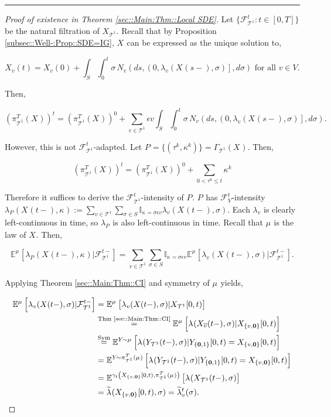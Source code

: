 \documentclass[12pt]{article}
\newcommand{\mb}{\mathbb}
\newcommand{\mc}{\mathcal}
\newcommand{\ov}{\overline}
\newcommand{\os}{\overset}
\newcommand{\te}{\text}
\newcommand{\ep}{\epsilon}
\newcommand{\lin}{\rule{\linewidth}{0.4 pt}}
\newcommand{\exmu}[2]{\mb{E}^{#1}\left[#2\right]}	%
\renewcommand{\root}{\mathbf{0}}				%
\renewcommand{\v}{v}							%
\renewcommand{\S}{S}							%
\newcommand{\s}{\sigma}							%
\newcommand{\ev}{\ep}							%
\newcommand{\T}{T}								%
\renewcommand{\t}{t}							%
\newcommand{\cl}{\ov}							%
\newcommand{\poiss}[1]{N_{#1}}						%
\newcommand{\pup}[1]{^{#1}}							%
\newcommand{\tree}{\mc{T}}							%
\newcommand{\V}{V}									%
\renewcommand{\tt}{s}								%
\newcommand{\rt}[1]{\tau^{#1}}						%
\renewcommand{\it}{k}								%
\newcommand{\piV}[2]{\pi_{#1}^{#2}}					%
\newcommand{\rxvt}[2]{X_{#1}{(#2)}}					%
\newcommand{\rxvtt}[2]{Y_{#1}{(#2)}}				%
\newcommand{\rxvts}[2]{X_{#1}{#2}}					%
\newcommand{\rxvtts}[2]{Y_{#1}{#2}}					%
\newcommand{\rp}[1]{P^{#1}}							%
\newcommand{\m}[3]{\mu_{#2#1}^{#3}}						%
\newcommand{\cm}{\gamma}							%
\newcommand{\rate}[1]{\lambda_{#1}}					%
\newcommand{\crate}[2]{\alt{\lambda}_{#1}^{#2}}		%
\newcommand{\F}[2]{\mc{F}_{#1}^{#2}}				%
\newcommand{\alt}{\widetilde}						%
\renewcommand{\mark}[1]{\kappa^{#1}}				%
\newcommand{\pmap}[1]{\Gamma_{#1}}				%
\begin{document}
\lin

\begin{proof}[Proof of existence in Theorem \ref{sec::Main:Thm::Local SDE}]

Let \(\{\F{\tree\pup{1}}{\t}:\t\in [0,\T]\}\) be the natural filtration of \(\rxvts{\tree\pup{1}}{}\). Recall that by Proposition \ref{subsec::Well-:Prop::SDE=IG}, \(\rxvts{}{}\) can be expressed as the unique solution to,

\[\rxvt{\v}{\t} = \rxvt{\v}{0} + \int_\S\int_0^\t \s\,\poiss{\v}\left(d\tt,\left(0,\rate{\v}(\rxvt{}{\tt-},\s)\right],d\s\right) \te{ for all } \v \in \V.\]

Then,

\[\left(\piV{\tree\pup{1}}{\T}(\rxvts{}{})\right)^\t = \left(\piV{\tree\pup{1}}{\T}(\rxvts{}{})\right)^0 + \sum_{\v \in \tree\pup{1}}\ev{\v}\int_\S\int_0^\t \s\,\poiss{\v}\left(d\tt,\left(0,\rate{\v}(\rxvt{}{\tt-},\s)\right],d\s\right).\]

However, this is not \(\F{\tree\pup{1}}{\t}\)-adapted. Let \(\rp{} = \{(\rt{\it},\mark{\it})\} = \pmap{\tree\pup{1}}(\rxvts{}{}).\) Then,

\[\left(\piV{\tree\pup{1}}{\T}(\rxvts{}{})\right)^\t = \left(\piV{\tree\pup{1}}{\T}(\rxvts{}{})\right)^0 + \sum_{0 < \rt{\it} \leq t}\mark{\it}\]

Therefore it suffices to derive the \(\F{\tree\pup{1}}{\t}\)-intensity of \(\rp{}\). \(\rp{}\) has \(\F{\V}{\t}\)-intensity \(\rate{\rp{}}(\rxvt{}{\t-},\mark{}) := \sum_{\v \in \tree^1}\sum_{\s\in S}\mb{I}_{\mark{} = \s\ev{\v}}\rate{\v}(\rxvt{}{\t-},\s)\). Each \(\rate{\v}\) is clearly left-continuous in time, so \(\rate{\rp{}}\) is also left-continuous in time. Recall that \(\m{}{}{}\) is the law of \(\rxvts{}{}\). Then,

\[\exmu{\m{}{}{}}{\rate{\rp{}}(\rxvt{}{\t-},\mark{})|\F{\tree\pup{1}}{\t-}} = \sum_{\v \in \tree\pup{1}}\sum_{\s\in S} \mb{I}_{\mark{} = \s\ev{\v}}\exmu{\m{}{}{}}{\rate{\v}(\rxvt{}{\t-},\s)|\F{\tree\pup{1}}{\t-}}.\]

Applying Theorem \ref{sec::Main:Thm::CI} and symmetry of \(\m{}{}{}\) yields,

\begin{align*}
\exmu{\m{}{}{}}{\rate{\v}(\rxvt{}{\t-},\s)|\F{\tree\pup{1}}{\t-}} &= \exmu{\m{}{}{}}{\rate{\v}(\rxvt{}{\t-},\s)|\rxvts{\tree\pup{1}}{[0,\t)}}\\
&\os{\te{Thm \ref{sec::Main:Thm::CI}}}{=} \exmu{\m{}{}{}}{\rate{}(\rxvt{\cl{\v}}{\t-},\s)|\rxvts{\{\v,\root\}}{[0,\t)}} \\
&\os{\te{Sym}}{=} \exmu{\rxvtts{}{}\sim \m{}{}{}}{\rate{}(\rxvtt{\tree\pup{1}}{\t-},\s)|\rxvtts{\{\root,1\}}{[0,\t)} = \rxvts{\{\v,\root\}}{[0,\t)}}\\
&= \exmu{\rxvtts{}{}\sim \piV{\tree\pup{1}}{\T}(\m{}{}{})}{\rate{}(\rxvtt{\tree\pup{1}}{\t-},\s)|\rxvtts{\{\root,1\}}{[0,\t)} = \rxvts{\{\v,\root\}}{[0,\t)}}\\
&= \exmu{\cm_\t\left(\rxvts{\{\v,\root\}}{[0,\t)},\piV{\tree\pup{1}}{\T}(\m{}{}{})\right)}{\rate{}(\rxvt{\tree\pup{1}}{\t-},\s)}\\
&=\crate{}{}(\rxvts{\{\v,\root\}}{[0,\t)},\s) = \crate{\v}{\t}(\s).
\end{align*}


\end{proof}
\end{document}

